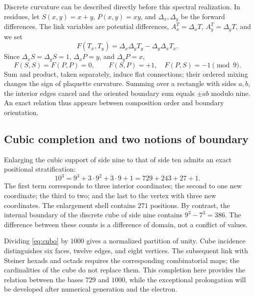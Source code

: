 Discrete curvature can be described directly before this spectral realization. In residues, let \(S(x,y)=x+y\), \(P(x,y)=xy\), and \(\Delta_x,\Delta_y\) be the forward differences. The link variables are potential differences, \(A_x^T=\Delta_xT\), \(A_y^T=\Delta_yT\), and we set
\[
 F(T_x,T_y)=\Delta_x\Delta_yT_y-\Delta_y\Delta_xT_x.
\]
Since \(\Delta_xS=\Delta_yS=1\), \(\Delta_xP=y\), and \(\Delta_yP=x\),
\begin{equation}
 F(S,S)=F(P,P)=0,\qquad F(S,P)=+1,\quad F(P,S)=-1\pmod9.
\end{equation}
Sum and product, taken separately, induce flat connections; their ordered mixing changes the sign of plaquette curvature. Summing over a rectangle with sides \(a,b\), the interior edges cancel and the oriented boundary sum equals \(\pm ab\) modulo nine. An exact relation thus appears between composition order and boundary orientation.

\subsection{Cubic completion and two notions of boundary}

Enlarging the cubic support of side nine to that of side ten admits an exact positional stratification:
\begin{equation}
 10^3=9^3+3\cdot9^2+3\cdot9+1=729+243+27+1.
 \label{eq:cubo}
\end{equation}
The first term corresponds to three interior coordinates; the second to one new coordinate; the third to two; and the last to the vertex with three new coordinates. The enlargement shell contains \(271\) positions. By contrast, the internal boundary of the discrete cube of side nine contains \(9^3-7^3=386\). The difference between these counts is a difference of domain, not a conflict of values.

Dividing \eqref{eq:cubo} by \(1000\) gives a normalized partition of unity. Cube incidence distinguishes six faces, twelve edges, and eight vertices. The subsequent link with Steiner hexads and octads requires the corresponding combinatorial maps; the cardinalities of the cube do not replace them. This completion here provides the relation between the bases \(729\) and \(1000\), while the exceptional prolongation will be developed after numerical generation and the electron.





